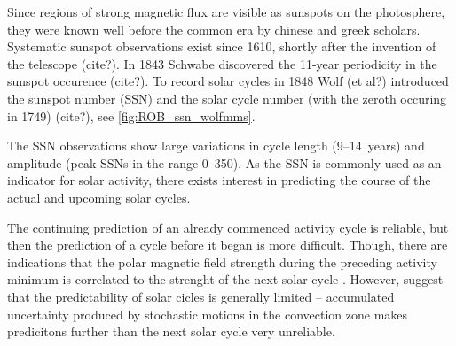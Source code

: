 Since regions of strong magnetic flux are visible as sunspots on the photosphere, they were known well before the common era by chinese and greek scholars. %
Systematic sunspot observations exist since 1610, shortly after the invention of the telescope (cite?). In 1843 Schwabe discovered the 11-year periodicity in the sunspot occurence (cite?). To record solar cycles in 1848 Wolf (et al?) introduced the sunspot number (SSN) and the solar cycle number (with the zeroth occuring in 1749) (cite?), see \autoref{fig:ROB_ssn_wolfmms}.\\
\begin{figure}[htb]
\end{figure}
The SSN observations show large variations in cycle length (9--14~years) and amplitude (peak SSNs in the range 0--350). As the SSN is commonly used as an indicator for solar activity, there exists interest in predicting the course of the actual and upcoming solar cycles.

The continuing prediction of an already commenced activity cycle is reliable, but then the prediction of a cycle before it began is more difficult. Though, there are indications that the polar magnetic field strength during the preceding activity minimum is correlated to the strenght of the next solar cycle \citep{Schatten1987}. However, \citet{Hathaway2016} suggest that the predictability of solar cicles is generally limited -- accumulated uncertainty produced by stochastic motions in the convection zone makes predicitons further than the next solar cycle very unreliable.\\

